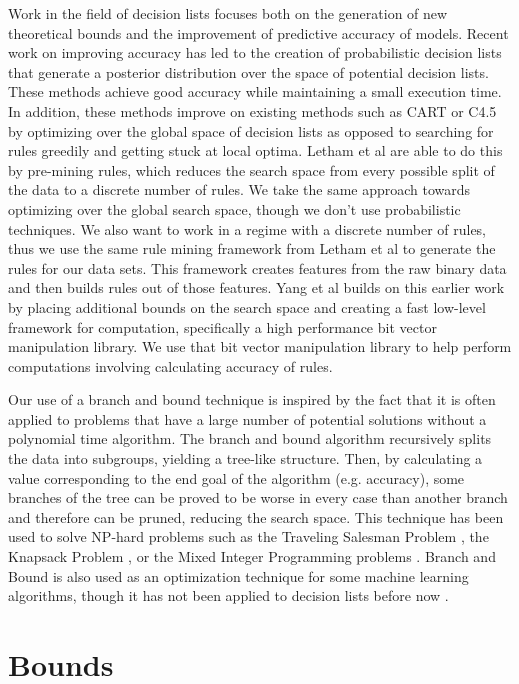 \documentclass[]{article}
\begin{document}
Work in the field of decision lists focuses both on the generation of new theoretical bounds and the improvement of predictive accuracy of models. Recent work on improving accuracy has led to the creation of probabilistic decision lists that generate a posterior distribution over the space of potential decision lists\cite{LethamRuMcMa15,YangRuSe16}. These methods achieve good accuracy while maintaining a small execution time. In addition, these methods improve on existing methods such as CART or C4.5 by optimizing over the global space of decision lists as opposed to searching for rules greedily and getting stuck at local optima. Letham et al are able to do this by pre-mining rules, which reduces the search space from every possible split of the data to a discrete number of rules. We take the same approach towards optimizing over the global search space, though we don’t use probabilistic techniques. We also want to work in a regime with a discrete number of rules, thus we use the same rule mining framework from Letham et al to generate the rules for our data sets. This framework creates features from the raw binary data and then builds rules out of those features. Yang et al builds on this earlier work by placing additional bounds on the search space and creating a fast low-level framework for computation, specifically a high performance bit vector manipulation library. We use that bit vector manipulation library to help perform computations involving calculating accuracy of rules.

Our use of a branch and bound technique is inspired by the fact that it is often applied to problems that have a large number of potential solutions without a polynomial time algorithm. The branch and bound algorithm recursively splits the data into subgroups, yielding a tree-like structure. Then, by calculating a value corresponding to the end goal of the algorithm (e.g. accuracy), some branches of the tree can be proved to be worse in every case than another branch and therefore can be pruned, reducing the search space. This technique has been used to solve NP-hard problems such as the Traveling Salesman Problem \cite{LittleMuSwKa63}, the Knapsack Problem \cite{Kolesar67}, or the Mixed Integer Programming problems \cite{Clausen99}. Branch and Bound is also used as an optimization technique for some machine learning algorithms, though it has not been applied to decision lists before now \cite{ChapelleSiKe06}.

\section{Bounds} \label{bounds}
\end{document}
